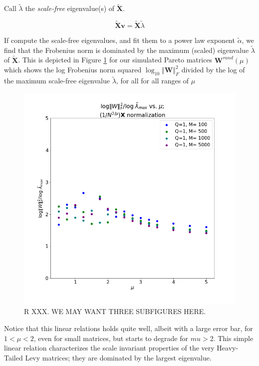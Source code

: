 Call $\tilde{\lambda}$ the \emph{scale-free} eigenvalue(s) of $\tilde{\mathbf{X}}$.

$$\tilde{\mathbf{X}}\mathbf{v}=\tilde{\mathbf{X}}\tilde{\lambda}$$

If compute the scale-free eigenvalues, and fit them to a power law exponent $\tilde{\alpha}$, we find that the Frobenius norm is dominated by the maximum (scaled) eigenvalue $\tilde{\lambda}$ of $\tilde{\mathbf{X}}$.  
This is depicted in Figure 
  \ref{fig:logNormHat}
for our simulated Pareto matrices  $\mathbf{W}^{rand}(\mu)$ which shows
the log Frobenius norm squared $\log_{10}\Vert\mathbf{W}\Vert^{2}_{F}$ divided by the log of the maximum scale-free eigenvalue $\tilde{\lambda}$,
for all for all ranges of $\mu$

\begin{figure}[!htb]
 \centering
   \includegraphics[scale=0.40]{img/LogNorm-Lmax-Scaled.png}
   \caption{R XXX.  WE MAY WANT THREE SUBFIGURES HERE.}
  \label{fig:logNormHat}
\end{figure}

Notice that this linear relations holds quite well, albeit with a large error bar, for $1<\mu<2$, even for small matrices, but starts to degrade for $mu>2$.
This simple linear relation characterizes the scale invariant properties of the very Heavy-Tailed Levy matrices; they are dominated by the largest eigenvalue.


